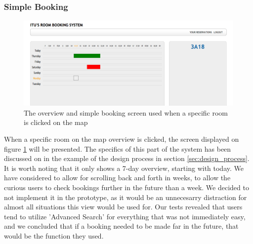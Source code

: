 \subsubsection*{Simple Booking}
\begin{figure}[htb]
\begin{center}
\leavevmode
\includegraphics[width=1\textwidth]{images/simple_booking}
\end{center}
\caption{The overview and simple booking screen used when a specific room is clicked on the map}
\label{fig:simple_booking}
\end{figure}
When a specific room on the map overview is clicked, the screen displayed on figure \ref{fig:simple_booking} will be presented. The specifics of this part of the system has been discussed on in the example of the design process in section \ref{sec:design_process}.
It is worth noting that it only shows a 7-day overview, starting with today. We have considered to allow for scrolling back and forth in weeks, to allow the curious users to check bookings further in the future than a week.
We decided to not implement it in the prototype, as it would be an unnecesarry distraction for almost all situations this view would be used for.
Our tests revealed that users tend to utilize 'Advanced Search' for everything that was not immediately easy, and we concluded that if a booking needed to be made far in the future, that would be the function they used.

\pagebreak
